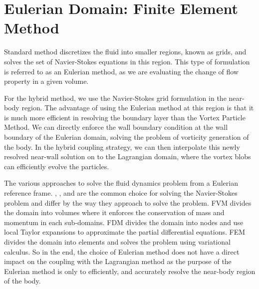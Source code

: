 \chapter{Eulerian Domain: Finite Element Method}
\label{ch:eulerian}
	

Standard  method discretizes the fluid into smaller regions, known as grids, and solves the set of Navier-Stokes equations in this region. This type of formulation is referred to as an Eulerian method, as we are evaluating the change of flow property in a given volume.

For the hybrid method, we use the Navier-Stokes grid formulation in the near-body region. The advantage of using the Eulerian method at this region is that it is much more efficient in resolving the boundary layer than the Vortex Particle Method. We can directly enforce the wall boundary condition at the wall boundary of the Eulerian domain, solving the problem of vorticity generation of the body. In the hybrid coupling strategy, we can then interpolate this newly resolved near-wall solution on to the Lagrangian domain, where the vortex blobs can efficiently evolve the particles.

The various approaches to solve the fluid dynamics problem from a Eulerian reference frame. , , and  are the common choice for solving the Navier-Stokes problem and differ by the way they approach to solve the problem. FVM divides the domain into volumes where it enforces the conservation of mass and momentum in each sub-domains. FDM divides the domain into nodes and use local Taylor expansions to approximate the partial differential equations. FEM divides the domain into elements and solves the problem using variational calculus. So in the end, the choice of Eulerian method does not have a direct impact on the coupling with the Lagrangian method as the purpose of the Eulerian method is only to efficiently, and accurately resolve the near-body region of the body.

